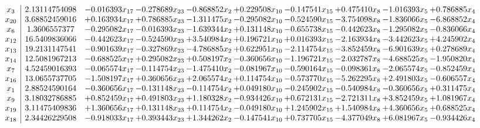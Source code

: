 \documentclass[10pt]{article}
\begin{document}
 \[\begin{array}{c| c c@{\hskip 2pt} c@{\hskip 2pt} c@{\hskip 2pt} c@{\hskip 2pt} c@{\hskip 2pt} c@{\hskip 2pt} c@{\hskip 2pt} c@{\hskip 2pt} }
 x_{3}   &  2.13114754098 & -0.016393 x_{17} & -0.278689 x_{23} & -0.868852 x_{2} & + 0.229508 x_{10} & -0.147541 x_{15} & + 0.475410 x_{8} & -1.016393 x_{5} & + 0.786885 x_{4}\\
 x_{20}   &  3.68852459016 & + 0.163934 x_{17} & + 0.786885 x_{23} & -1.311475 x_{2} & -0.295082 x_{10} & -0.524590 x_{15} & -3.754098 x_{8} & -1.836066 x_{5} & -6.868852 x_{4}\\
 x_{6}   &  1.3606557377 & -0.295082 x_{17} & -0.016393 x_{23} & -1.639344 x_{2} & + 0.131148 x_{10} & -0.655738 x_{15} & -0.442623 x_{8} & -1.295082 x_{5} & -0.836066 x_{4}\\
 x_{12}   &  16.5409836066 & -0.442623 x_{17} & -0.524590 x_{23} & + 3.540984 x_{2} & + 0.196721 x_{10} & + 0.016393 x_{15} & -2.163934 x_{8} & -3.442623 x_{5} & + 4.245902 x_{4}\\
 x_{13}   &  19.2131147541 & -0.901639 x_{17} & -0.327869 x_{23} & -4.786885 x_{2} & + 0.622951 x_{10} & -2.114754 x_{15} & -3.852459 x_{8} & -6.901639 x_{5} & + 0.278689 x_{4}\\
 x_{14}   &  12.5081967213 & -0.688525 x_{17} & + 0.295082 x_{23} & + 0.508197 x_{2} & -0.360656 x_{10} & -1.196721 x_{15} & -2.032787 x_{8} & -4.688525 x_{5} & -1.950820 x_{4}\\
 x_{7}   &  4.52459016393 & -0.065574 x_{17} & -0.114754 x_{23} & -1.475410 x_{2} & -0.081967 x_{10} & -0.590164 x_{15} & -0.098361 x_{8} & -2.065574 x_{5} & -0.852459 x_{4}\\
 x_{16}   &  13.0655737705 & -1.508197 x_{17} & + 0.360656 x_{23} & + 2.065574 x_{2} & + 0.114754 x_{10} & -0.573770 x_{15} & -5.262295 x_{8} & + 2.491803 x_{5} & -0.606557 x_{4}\\
 x_{1}   &  2.88524590164 & -0.360656 x_{17} & -0.131148 x_{23} & -0.114754 x_{2} & + 0.049180 x_{10} & -0.245902 x_{15} & -0.540984 x_{8} & -0.360656 x_{5} & + 0.311475 x_{4}\\
 x_{9}   &  3.18032786885 & + 0.852459 x_{17} & + 0.491803 x_{23} & + 1.180328 x_{2} & -0.934426 x_{10} & + 0.672131 x_{15} & -2.721311 x_{8} & + 3.852459 x_{5} & + 1.081967 x_{4}\\
 x_{19}   &  3.11475409836 & + 1.360656 x_{17} & + 0.131148 x_{23} & + 0.114754 x_{2} & -0.049180 x_{10} & + 1.245902 x_{15} & + 1.540984 x_{8} & + 4.360656 x_{5} & + 0.688525 x_{4}\\
 x_{18}   &  2.34426229508 & -0.918033 x_{17} & + 0.393443 x_{23} & + 1.344262 x_{2} & -0.147541 x_{10} & + 0.737705 x_{15} & -4.377049 x_{8} & + 6.081967 x_{5} & -0.934426 x_{4}\\

\end{array}\]
\end{document}
